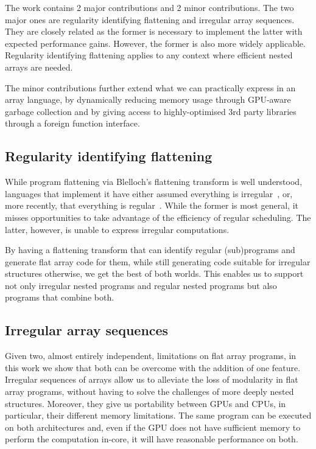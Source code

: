 The work contains 2 major contributions and 2 minor contributions. The two major ones are regularity identifying flattening and irregular array sequences. They are closely related as the former is necessary to implement the latter with expected performance gains. However, the former is also more widely applicable. Regularity identifying flattening applies to any context where efficient nested arrays are needed.

The minor contributions further extend what we can practically express in an array language, by dynamically reducing memory usage through GPU-aware garbage collection and by giving access to highly-optimised 3rd party libraries through a foreign function interface.

\subsection{Regularity identifying flattening}

While program flattening via Blelloch's flattening transform is well understood, languages that implement it have either assumed everything is irregular~\cite{Blelloch:nesl1995,bergstrom:ndp2gpu,Chakravarty:DPH,Fluet:2007:manticore,proteus-frontiers95}, or, more recently, that everything is regular~\cite{Henriksen:2017futhark}. While the former is most general, it misses opportunities to take advantage of the efficiency of regular scheduling. The latter, however, is unable to express irregular computations.

By having a flattening transform that can identify regular (sub)programs and generate flat array code for them, while still generating code suitable for irregular structures otherwise, we get the best of both worlds. This enables us to support not only irregular nested programs and regular nested programs but also programs that combine both.

\subsection{Irregular array sequences}

Given two, almost entirely independent, limitations on flat array programs, in this work we show that both can be overcome with the addition of one feature. Irregular sequences of arrays allow us to alleviate the loss of modularity in flat array programs, without having to solve the challenges of more deeply nested structures. Moreover, they give us portability between GPUs and CPUs, in particular, their different memory limitations. The same program can be executed on both architectures and, even if the GPU does not have sufficient memory to perform the computation in-core, it will have reasonable performance on both.


